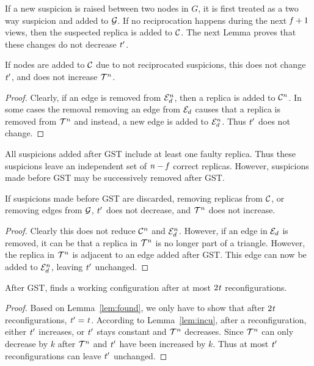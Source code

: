 If a new suspicion is raised between two nodes in $G$, it is first treated as a two way suspicion and added to $\mathcal{G}$. If no reciprocation happens during the next $\mathit{f}+1$ views, then the suspected replica is added to $\mathcal{C}$.
The next Lemma proves that these changes do not decrease $\mathit{t}'$.

\begin{lemma}
\label{lem:nodecu}
If nodes are added to $\mathcal{C}$ due to not reciprocated suspicions, this does not change $\mathit{t}'$, and does not increase $\mathcal{T}^n$.
\end{lemma}

\begin{proof}
Clearly, if an edge is removed from $\mathcal{E}_d^n$, then a replica is added to $\mathcal{C}^n$.
In some cases the removal removing an edge from $\mathcal{E}_d$ causes that a replica is removed from $\mathcal{T}^n$ and instead, a new edge is added to $\mathcal{E}_d^n$.
Thus $\mathit{t}'$ does not change.
\end{proof}

All suspicions added after GST include at least one faulty replica. Thus these suspicions leave an independent set of $\mathit{n}-\mathit{f}$ correct replicas.
However, suspicions made before GST may be successively removed after GST.

\begin{lemma}
\label{lem:oldremove}
If suspicions made before GST are discarded, removing replicas from $\mathcal{C}$, or removing edges from $\mathcal{G}$, $\mathit{t}'$ does not decrease, and $\mathcal{T}^n$ does not increase.
\end{lemma}
\begin{proof}
Clearly this does not reduce $\mathcal{C}^n$ and $\mathcal{E}_d^n$.
However, if an edge in $\mathcal{E}_d$ is removed, it can be that a replica in $\mathcal{T}^n$ is no longer part of a triangle.
However, the replica in $\mathcal{T}^n$ is adjacent to an edge added after GST. This edge can now be added to $\mathcal{E}_d^n$, leaving $\mathit{t}'$ unchanged.
\end{proof}

\begin{theorem}
\label{thm:2t}
After GST, \optitree finds a working configuration after at most $2\mathit{t}$ reconfigurations.
\end{theorem}
\begin{proof}
Based on Lemma~\ref{lem:found}, we only have to show that after $2\mathit{t}$ reconfigurations, $\mathit{t}'=\mathit{t}$.
According to Lemma~\ref{lem:incu}, after a reconfiguration, either $\mathit{t}'$ increases, or $\mathit{t}'$ stays constant and $\mathcal{T}^n$ decreases.
Since $\mathcal{T}^n$ can only decrease by $k$ after $\mathcal{T}^n$ and $\mathit{t}'$
have been increased by $k$. Thus at most $\mathit{t}'$ reconfigurations can leave $\mathit{t}'$ unchanged.
\end{proof}
